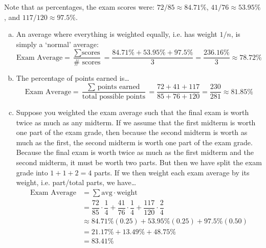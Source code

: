 \documentclass[11pt,letterpaper]{article}
\begin{document}
\sol Note that as percentages, the exam scores were: $72/85 \approx 84.71\%$, $41/76 \approx 53.95\%$, and $117/120 \approx 97.5\%$. 
\begin{enumerate}[(a)]
\item An average where everything is weighted equally, i.e. has weight $1/n$, is simply a `normal' average:
	\[
	\text{Exam Average}= \dfrac{\sum \text{scores}}{\# \text{ scores}}= \dfrac{84.71\% + 53.95\% + 97.5\%}{3}= \dfrac{236.16\%}{3} \approx 78.72\%
	\]

\item The percentage of points earned is\dots
	\[
	\text{Exam Average}= \dfrac{\sum \text{ points earned}}{\text{total possible points}}= \dfrac{72 + 41 + 117}{85 + 76 + 120}= \dfrac{230}{281} \approx 81.85\%
	\]

\item Suppose you weighted the exam average such that the final exam is worth twice as much as any midterm. If we assume that the first midterm is worth one part of the exam grade, then because the second midterm is worth as much as the first, the second midterm is worth one part of the exam grade. Because the final exam is worth twice as much as the first midterm and the second midterm, it must be worth two parts. But then we have split the exam grade into $1 + 1 + 2= 4$ parts. If we then weight each exam average by its weight, i.e. part/total parts, we have\dots
	\[
	\begin{aligned}
	\text{Exam Average}&= \sum \text{avg} \cdot \text{weight} \\
	&= \dfrac{72}{85} \cdot \dfrac{1}{4} + \dfrac{41}{76} \cdot \dfrac{1}{4} + \dfrac{117}{120} \cdot \dfrac{2}{4} \\
	&\approx 84.71\% (0.25) + 53.95\% (0.25) + 97.5\% (0.50) \\
	&= 21.17\% + 13.49\% + 48.75\% \\
	&= 83.41\%
	\end{aligned}
	\]


\end{enumerate}
\end{document}
